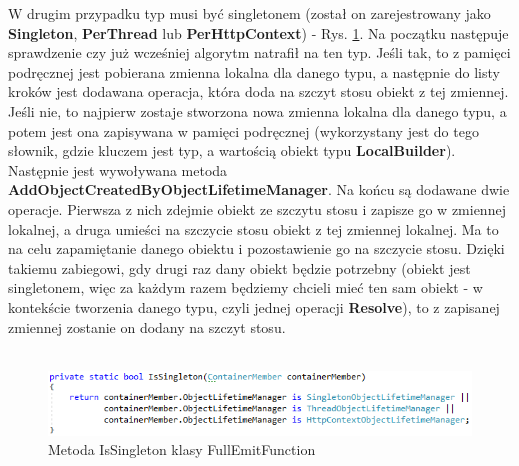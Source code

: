 \documentclass[12pt]{article}
\begin{document}
W drugim przypadku typ musi być singletonem (został on zarejestrowany jako \textbf{Singleton}, \textbf{PerThread} lub \textbf{PerHttpContext}) - Rys. \ref{fig:FullEmitFunction_IsSingleton}. Na początku następuje sprawdzenie czy już wcześniej algorytm natrafił na ten typ. Jeśli tak, to z pamięci podręcznej jest pobierana zmienna lokalna dla danego typu, a następnie do listy kroków jest dodawana operacja, która doda na szczyt stosu obiekt z tej zmiennej. Jeśli nie, to najpierw zostaje stworzona nowa zmienna lokalna dla danego typu, a potem jest ona zapisywana w pamięci podręcznej (wykorzystany jest do tego słownik, gdzie kluczem jest typ, a wartością obiekt typu \textbf{LocalBuilder}). Następnie jest wywoływana metoda \textbf{AddObjectCreatedByObjectLifetimeManager}. Na końcu są dodawane dwie operacje. Pierwsza z nich zdejmie obiekt ze szczytu stosu i zapisze go w zmiennej lokalnej, a druga umieści na szczycie stosu obiekt z tej zmiennej lokalnej. Ma to na celu zapamiętanie danego obiektu i pozostawienie go na szczycie stosu. Dzięki takiemu zabiegowi, gdy drugi raz dany obiekt będzie potrzebny (obiekt jest singletonem, więc za każdym razem będziemy chcieli mieć ten sam obiekt - w kontekście tworzenia danego typu, czyli jednej operacji \textbf{Resolve}), to z zapisanej zmiennej zostanie on dodany na szczyt stosu.\\ \\
\begin{figure}[H]
	\begin{center}
  		\includegraphics{FullEmitFunction_IsSingleton.png}
  		\caption{Metoda IsSingleton klasy FullEmitFunction}
  		\label{fig:FullEmitFunction_IsSingleton}
	\end{center}
\end{figure}
\end{document}
